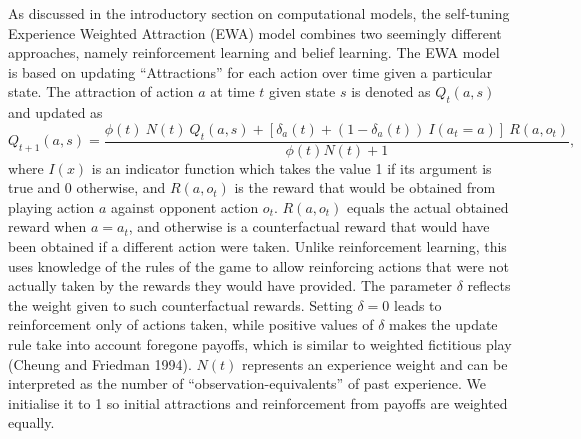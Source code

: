 \documentclass[smallextended]{svjour3}       %
\begin{document}
As discussed in the introductory section on computational models, the
self-tuning Experience Weighted Attraction (EWA) model combines two
seemingly different approaches, namely reinforcement learning and belief
learning. The EWA model is based on updating ``Attractions'' for each
action over time given a particular state. The attraction of action
\(a\) at time \(t\) given state \(s\) is denoted as \(Q_{t}(a, s)\) and
updated as
\[ Q_{t+1}(a,s) =  \frac{\phi(t) \ N(t) \ Q_{t}(a,s) + [ \delta_{a}(t) + (1-\delta_{a}(t)) \ I(a_t = a )] \ R(a,o_t) } {\phi(t)N(t) + 1} ,\]
where \(I(x)\) is an indicator function which takes the value 1 if its
argument is true and 0 otherwise, and \(R(a,o_t)\) is the reward that
would be obtained from playing action \(a\) against opponent action
\(o_t\). \(R(a,o_t)\) equals the actual obtained reward when
\(a = a_t\), and otherwise is a counterfactual reward that would have
been obtained if a different action were taken. Unlike reinforcement
learning, this uses knowledge of the rules of the game to allow
reinforcing actions that were not actually taken by the rewards they
would have provided. The parameter \(\delta\) reflects the weight given
to such counterfactual rewards. Setting \(\delta = 0\) leads to
reinforcement only of actions taken, while positive values of \(\delta\)
makes the update rule take into account foregone payoffs, which is
similar to weighted fictitious play (Cheung and Friedman 1994). \(N(t)\)
represents an experience weight and can be interpreted as the number of
``observation-equivalents'' of past experience. We initialise it to 1 so
initial attractions and reinforcement from payoffs are weighted equally.
\end{document}
